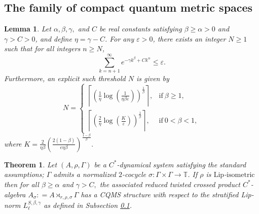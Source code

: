 \documentclass[10pt,a4paper]{amsart}
\newtheorem{thm}{Theorem}
\newtheorem{lem}{Lemma}
\begin{document}
\subsection{The family of compact quantum metric spaces} \label{Lip-norm defn}

\begin{lem} \label{threshold}
Let $\alpha, \beta, \gamma,$ and $C$ be real constants satisfying $\beta \ge \alpha > 0$ and $\gamma > C > 0$, and define $\eta = \gamma - C$. For any $\varepsilon > 0$, there exists an integer $N \ge 1$ such that for all integers $n \ge N$,
\begin{equation*}
    \sum_{k=n+1}^{\infty} e^{-\gamma k^\beta + C k^\alpha} \le \varepsilon.
\end{equation*}
Furthermore, an explicit such threshold $N$ is given by
\begin{equation*}
    N = \begin{cases}
    \left\lceil \left(\frac {1} {\eta} \log \left (\frac {1} {\eta \beta \varepsilon} \right) \right )^{\frac{1}{\beta}} \right \rceil, & \mathrm{if }\ \beta \ge 1, \\[12pt]
    \left\lceil \left( \frac{2}{\eta} \log \left (\frac {K} {\varepsilon} \right) \right)^{\frac{1}{\beta}} \right\rceil, & \mathrm{if }\ 0 < \beta < 1,
    \end{cases}
\end{equation*}
where $K = \frac{2}{\eta \beta} \left( \frac{2(1-\beta)}{e \eta \beta} \right)^{\frac{1-\beta}{\beta}}.$
\end{lem}

\begin{thm}
Let $(A,\rho,\Gamma)$ be a $C^{\ast}$-dynamical system satisfying the standard assumptions; $\Gamma$ admits a normalized $2$-cocycle $\sigma : \Gamma \times \Gamma \rightarrow \mathbb{T}$. If $\rho$ is $\mathrm{Lip}$-$\mathrm {isometric}$ then for all $\beta \geq \alpha$ and $\gamma > C,$ the associated reduced twisted crossed product $C^{\ast}$-algebra $A_{\sigma} : = A \rtimes_{r, \rho, \sigma} \Gamma$ has a CQMS structure with respect to the stratified Lip-norm $L^{S, \beta, \gamma}_{\ell}$ as defined in Subsection \ref{Lip-norm defn}.
\end{thm}
\end{document}
